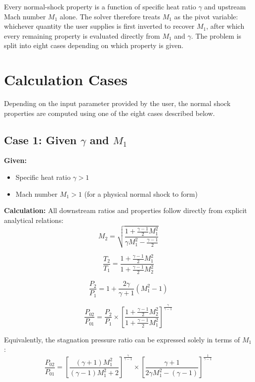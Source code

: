 Every normal-shock property is a function of specific heat ratio $\gamma$ and upstream Mach number $M_1$ alone. The solver therefore treats $M_1$ as the pivot variable: whichever quantity the user supplies is first inverted to recover $M_1$, after which every remaining property is evaluated directly from $M_1$ and $\gamma$. The problem is split into eight cases depending on which property is given.

\section{Calculation Cases}

Depending on the input parameter provided by the user, the normal shock properties are computed using one of the eight cases described below.

\subsection*{Case 1: Given $\gamma$ and $M_1$}

\textbf{Given:}
\begin{itemize}[nosep]
    \item Specific heat ratio $\gamma > 1$
    \item Mach number $M_1 > 1$ (for a physical normal shock to form)
\end{itemize}

\textbf{Calculation:} All downstream ratios and properties follow directly from explicit analytical relations:
\begin{equation}
M_2 = \sqrt{\frac{1+\frac{\gamma-1}{2}M_1^2}{\gamma M_1^2 - \frac{\gamma-1}{2}}}
\end{equation}

\begin{equation}
\frac{T_2}{T_1} = \frac{1+\frac{\gamma-1}{2}M_1^2}{1+\frac{\gamma-1}{2}M_2^2}
\end{equation}

\begin{equation}
\frac{P_2}{P_1} = 1 + \frac{2\gamma}{\gamma+1}(M_1^2-1)
\end{equation}

\begin{equation}
\frac{P_{02}}{P_{01}} = \frac{P_2}{P_1}\times\left[\frac{1+\frac{\gamma-1}{2}M_2^2}{1+\frac{\gamma-1}{2}M_1^2}\right]^{\frac{\gamma}{\gamma-1}}
\end{equation}

Equivalently, the stagnation pressure ratio can be expressed solely in terms of $M_1$:
\begin{equation}
\frac{P_{02}}{P_{01}} = \left[\frac{(\gamma+1)M_1^2}{(\gamma-1)M_1^2+2}\right]^{\frac{\gamma}{\gamma-1}} \times \left[\frac{\gamma+1}{2\gamma M_1^2-(\gamma-1)}\right]^{\frac{1}{\gamma-1}}
\end{equation}

